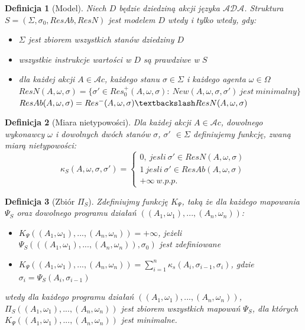 \documentclass[11pt,a4paper]{article}
\newtheorem{definition}{Definicja}[section]
\begin{document}
    \begin{definition}[Model]
    Niech $D$ będzie dziedziną akcji języka $\mathcal{ADA}$. Struktura $S=(\Sigma, \sigma_0, ResAb, ResN)$ jest modelem $D$ wtedy i tylko wtedy, gdy:
    \begin{itemize}
        \item $\Sigma$ jest zbiorem wszystkich stanów dziedziny $D$
        \item wszystkie instrukcje wartości w $D$ są prawdziwe w $S$
        \item dla każdej akcji $A \in \mathcal{A}c$, każdego stanu $\sigma \in \Sigma$ i każdego agenta $\omega \in \Omega$
        \\$ResN(A,\omega,\sigma)=\{\sigma' \in Res_0^+(A,\omega,\sigma):~ New(A,\omega,\sigma,\sigma')~jest~minimalny\}$
        \\$ResAb(A,\omega,\sigma)=Res^-(A,\omega,\sigma) \textbackslash ResN(A,\omega,\sigma)$
    \end{itemize}
    \end{definition}
    
    \begin{definition}[Miara nietypowości]
    Dla każdej akcji $A \in \mathcal{A}c$, dowolnego wykonawcy $\omega$ i dowolnych dwóch stanów $\sigma$, $\sigma'$ $\in \Sigma$ definiujemy funkcję, zwaną miarą nietypowości: \\
    \[
    \kappa_S(A, \omega, \sigma, \sigma') = \left \{
        \begin{array}{ll}
             0,~jesli~\sigma' \in ResN(A, \omega, \sigma) \\
             1~jesli~\sigma' \in ResAb(A, \omega, \sigma) \\
             + \infty ~w.p.p.
         \end{array}
     \right.
    \]
    
    \end{definition}
    
    \begin{definition}[Zbiór $\Pi_S$]
    	Zdefiniujmy funkcję $K_{\Psi}$, taką że dla każdego mapowania $\Psi_S$ oraz dowolnego programu działań $((A_1, \omega_1),...,(A_n,\omega_n))$:
    	\begin{itemize}
    		\item $K_{\Psi}((A_1, \omega_1),...,(A_n,\omega_n)) = + \infty$, jeżeli $\Psi_S(((A_1, \omega_1),...,(A_n,\omega_n)), \sigma_0)$ jest zdefiniowane
    		\item $K_{\Psi}((A_1, \omega_1),...,(A_n,\omega_n)) = \sum_{i=1}^{n} \kappa_s(A_i, \sigma_{i-1}, \sigma_i)$, gdzie $\sigma_i = \Psi_S(A_i, \sigma_{i-1})$
    	\end{itemize}
    	
    	wtedy dla każdego programu działań $((A_1, \omega_1),...,(A_n,\omega_n))$, $\Pi_S((A_1, \omega_1),...,(A_n,\omega_n))$ jest zbiorem wszystkich mapowań $\Psi_S$, dla których $K_{\Psi}((A_1, \omega_1),...,(A_n,\omega_n))$ jest minimalne.
    \end{definition}
    
\end{document}
